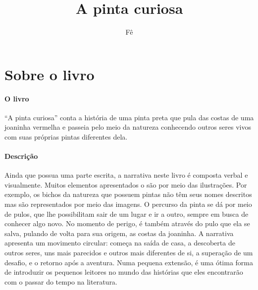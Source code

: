 \documentclass[11pt]{extarticle}
\newcommand{\AutorLivro}{Fê}
\newcommand{\TituloLivro}{A pinta curiosa}
\newcommand{\colaborador}{{Paulo Pompermaier e Renier Silva}}
\begin{document}
\title{\TituloLivro}
\author{\AutorLivro}
\def\authornotes{\colaborador}

\date{}
\maketitle


\tableofcontents



\section{Sobre o livro}

\paragraph{O livro} 
``A pinta curiosa'' conta a história de uma pinta preta que pula das costas de 
uma joaninha vermelha e passeia pelo meio da natureza conhecendo outros
seres vivos com suas próprias pintas diferentes dela. 

\paragraph{Descrição} 
Ainda que possua uma parte escrita, a narrativa neste livro é composta
verbal e visualmente. Muitos elementos apresentados o são por meio das
ilustrações. Por exemplo, os bichos da natureza que possuem pintas 
não têm seus nomes descritos mas são representados por meio das imagens.
O percurso da pinta se dá por meio de pulos, que lhe possibilitam sair de 
um lugar e ir a outro, sempre em busca de conhecer algo novo. No
momento de perigo, é também através do pulo que ela se salva, pulando de volta 
para sua origem, as costas da joaninha. 
A narrativa apresenta um movimento circular: começa na saída de casa,
a descoberta de outros seres, uns mais parecidos e outros mais diferentes de si, 
a superação de um desafio, e o retorno após a aventura. Numa pequena extensão,
é uma ótima forma de introduzir os pequenos leitores no mundo das histórias
que eles encontrarão com o passar do tempo na literatura.

\end{document}

